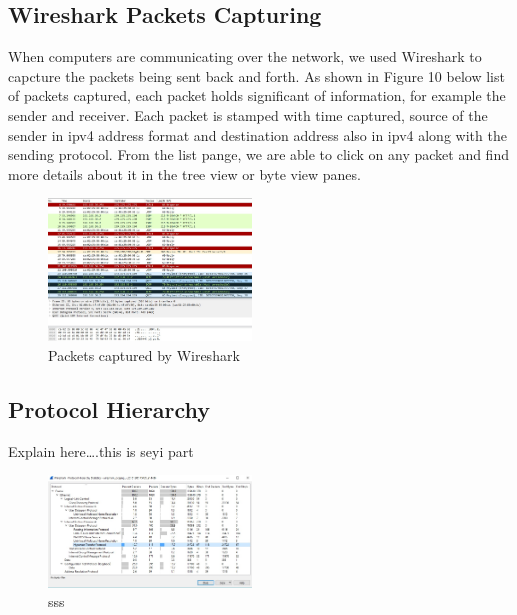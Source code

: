 \documentclass{article}
\begin{document}
\subsection{Wireshark Packets Capturing}
When computers are communicating over the network, we used Wireshark to capcture the packets being sent back and forth. As shown in Figure 10 below list of packets captured, each packet holds significant of information, for example the sender and receiver. Each packet is stamped with time captured, source of the sender in ipv4 address format and destination address also in ipv4 along with the sending protocol. From the list pange, we are able to click on any packet and find more details about it in the tree view or byte view panes. 

\begin{figure}[H]
	\begin{center}
		\includegraphics[width=0.48\textwidth]{wireshark.jpg}
	\end{center}
	\caption{Packets captured by Wireshark}
	\label{fig:Prd}
\end{figure}

\subsection{Protocol Hierarchy}
Explain here….this is seyi part
\begin{figure}[H]
	\begin{center}
		\includegraphics[width=0.48\textwidth]{Hierarchyst.jpg}
	\end{center}
	\caption{\small  sss\newline}
	\label{fig:Prd}
\end{figure}
\end{document}
